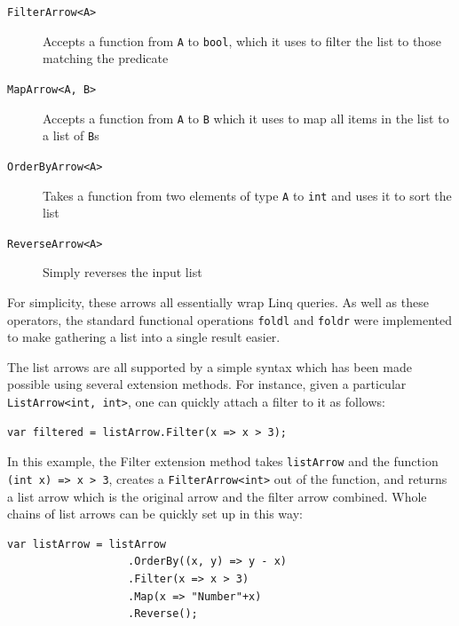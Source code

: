 \documentclass[12pt,twoside,notitlepage]{report}
\begin{document}
\begin{description}
	\item[\texttt{FilterArrow<A>}] Accepts a function from \texttt{A} to \texttt{bool}, which it uses to filter the list to those matching the predicate
	\item[\texttt{MapArrow<A, B>}] Accepts a function from \texttt{A} to \texttt{B} which it uses to map all items in the list to a list of \texttt{B}s
	\item[\texttt{OrderByArrow<A>}] Takes a function from two elements of type \texttt{A} to \texttt{int} and uses it to sort the list
	\item[\texttt{ReverseArrow<A>}] Simply reverses the input list
\end{description}

For simplicity, these arrows all essentially wrap Linq queries. As well as these operators, the standard functional operations \texttt{foldl} and \texttt{foldr} were implemented to make gathering a list into a single result easier.

The list arrows are all supported by a simple syntax which has been made possible using several extension methods. For instance, given a particular \texttt{ListArrow<int, int>}, one can quickly attach a filter to it as follows:

\begin{lstlisting}[language={[Sharp]C}]
var filtered = listArrow.Filter(x => x > 3);
\end{lstlisting}

In this example, the Filter extension method takes \texttt{listArrow} and the function \texttt{(int x) => x > 3}, creates a \texttt{FilterArrow<int>} out of the function, and returns a list arrow which is the original arrow and the filter arrow combined. Whole chains of list arrows can be quickly set up in this way:

\begin{lstlisting}[language={[Sharp]C}]
var listArrow = listArrow
                   .OrderBy((x, y) => y - x)
                   .Filter(x => x > 3)
                   .Map(x => "Number"+x)
                   .Reverse();
\end{lstlisting}



\end{document}
